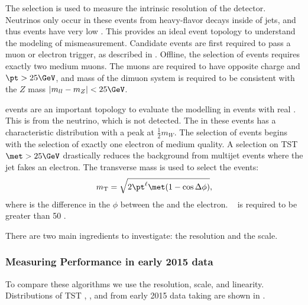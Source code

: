 The \Zll selection is used to measure the intrinsic \met resolution of the detector.
Neutrinos only occur in these events from heavy-flavor decays inside of jets, and thus \Zll events have very low \met.
This provides an ideal event topology to understand the modeling of \met mismeasurement.
Candidate \Zmm events are first required to pass a muon or electron trigger, as described in .
Offline, the selection of \Zmm events requires exactly two medium muons.
The muons are required to have opposite charge and $\pt > 25 \GeV$, and mass of the dimuon system is required to be consistent with the $Z$ mass $|m_{ll} - m_Z | < 25 \GeV$.

\Wln events are an important topology to evaluate the \met modelling in events with real \met.
This \met is from the neutrino, which is not detected.
The \met in these events has a characteristic distribution with a peak at $\frac{1}{2} m_W$.
The selection of \Wen events begins with the selection of exactly one electron of medium quality.
A selection on TST $\met > 25 \GeV$  drastically reduces the background from multijet events where the jet fakes an electron.
The transverse mass is used to select the \Wen events:
\begin{equation}
  \mT = \sqrt{ 2\pt^{\ell} \met (1-\cos{\deltaPhi}) },
\label{eq:mT}
\end{equation}
where \deltaPhi is the difference in the $\phi$ between the \met and the electron.
\mT~ is required to be greater than 50 \GeV.

There are two main ingredients to investigate: the \met resolution and the \met scale.

\subsubsection{Measuring \met Performance in early 2015 data}

To compare these algorithms we use the \met resolution, \met scale, and linearity.
Distributions of TST , , and  \met from early 2015 data taking are shown in .

